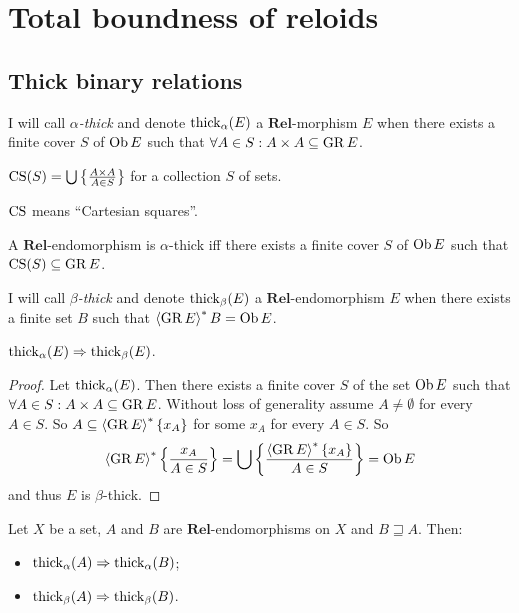 
\chapter{Total boundness of reloids}


\section{Thick binary relations}
\begin{defn}
I will call \emph{$\alpha$-thick} and denote $\operatorname{thick}_{\alpha}(E)$
a $\mathbf{Rel}$-morphism $E$ when there exists a finite cover $S$
of $\operatorname{Ob} E$ such that $\forall A\in S:A\times A\subseteq\operatorname{GR} E$.
\end{defn}

\begin{defn}
$\operatorname{CS}(S)=\bigcup\left\{ \frac{A\times A}{A\in S}\right\}$ for a collection $S$
of sets.\end{defn}
\begin{rem}
$\operatorname{CS}$ means ``Cartesian squares''.\end{rem}
\begin{obvious}
A $\mathbf{Rel}$-endomorphism is $\alpha$-thick iff there exists
a finite cover $S$ of $\operatorname{Ob} E$ such that $\operatorname{CS}(S)\subseteq\operatorname{GR} E$.\end{obvious}
\begin{defn}
I will call \emph{$\beta$-thick} and denote $\operatorname{thick}_{\beta}(E)$
a $\mathbf{Rel}$-endomorphism $E$ when there exists a finite set
$B$ such that $\left\langle \operatorname{GR} E\right\rangle ^{\ast}B=\operatorname{Ob} E$.\end{defn}
\begin{prop}
$\operatorname{thick}_{\alpha}(E)\Rightarrow\operatorname{thick}_{\beta}(E)$.\end{prop}
\begin{proof}
Let $\operatorname{thick}_{\alpha}(E)$. Then there exists a finite cover $S$ of
the set $\operatorname{Ob} E$ such that $\forall A\in S:A\times A\subseteq\operatorname{GR} E$.
Without loss of generality assume $A\ne\emptyset$ for every $A\in S$.
So $A\subseteq\left\langle \operatorname{GR} E\right\rangle ^{\ast}\{x_{A}\}$ for some $x_{A}$ for every
$A\in S$. So
\[
\left\langle \operatorname{GR} E\right\rangle ^{\ast}\left\{ \frac{x_{A}}{A\in S}\right\}=\bigcup\left\{ \frac{\left\langle \operatorname{GR} E\right\rangle ^{\ast}\{x_{A}\}}{A\in S}\right\}=\operatorname{Ob} E
\]
and thus $E$ is $\beta$-thick.\end{proof}
\begin{obvious}
Let $X$ be a set, $A$ and $B$ are $\mathbf{Rel}$-endomorphisms
on $X$ and $B\sqsupseteq A$. Then:
\begin{itemize}
\item $\operatorname{thick}_{\alpha}(A)\Rightarrow\operatorname{thick}_{\alpha}(B)$;
\item $\operatorname{thick}_{\beta}(A)\Rightarrow\operatorname{thick}_{\beta}(B)$.
\end{itemize}
\end{obvious}
